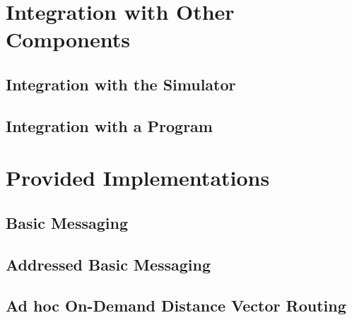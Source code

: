 \section{Integration with Other Components}
	\subsection{Integration with the Simulator}
		\label{int-sim}
	\subsection{Integration with a Program}
		\label{int-pro}

\section{Provided Implementations}
	\subsection{Basic Messaging}
	\subsection{Addressed Basic Messaging}
	\subsection{Ad hoc On-Demand Distance Vector Routing}